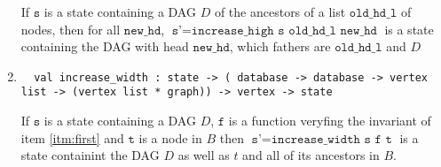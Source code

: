 \begin{enumerate}
 If $\texttt{s}$ is a state containing a DAG $D$ of the ancestors of a list $\texttt{old\_hd\_l}$ of nodes, then for all $\texttt{new\_hd}$, $\texttt{s'} = \texttt{increase\_high s old\_hd\_l new\_hd}$ is a state containing the DAG with head $\texttt{new\_hd}$, which fathers are $\texttt{old\_hd\_l}$ and $D$
 \item 
 \begin{lstlisting}
  val increase_width : state -> ( database -> database -> vertex list -> (vertex list * graph)) -> vertex -> state
 \end{lstlisting}

 If $\texttt{s}$ is a state containing a DAG $D$, $\texttt{f}$ is a function veryfing the invariant of item \ref{itm:first} and $\texttt{t}$ is a node in $B$ then $\texttt{s'} = \texttt{increase\_width s f t}$ is a state containint the DAG $D$ as well as $t$ and all of its ancestors in $B$.
\end{enumerate}
